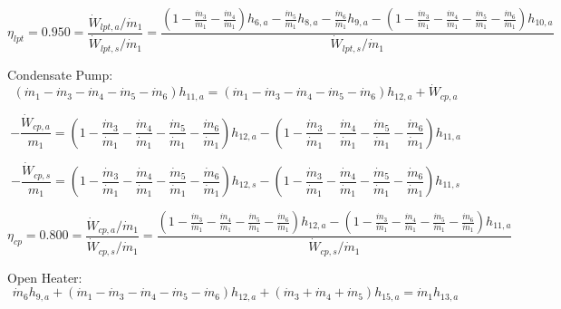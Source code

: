 \documentclass{article}
\begin{document}
\begin{equation}
\eta_{lpt} =    0.950 = \frac{\dot{W}_{lpt,a} / \dot{m}_{1}}{\dot{W}_{lpt,s} / \dot{m}_{1}} = \frac{
(1 - \frac{\dot{m}_{ 3}}{\dot{m}_{ 1}} - \frac{\dot{m}_{ 4}}{\dot{m}_{ 1}})h_{ 6,a} - \frac{\dot{m}_{ 5}}{\dot{m}_{ 1}}h_{ 8,a} - \frac{\dot{m}_{ 6}}{\dot{m}_{ 1}}h_{ 9,a} - (1 - \frac{\dot{m}_{ 3}}{\dot{m}_{ 1}} - \frac{\dot{m}_{ 4}}{\dot{m}_{ 1}} - \frac{\dot{m}_{ 5}}{\dot{m}_{ 1}} - \frac{\dot{m}_{ 6}}{\dot{m}_{ 1}})h_{10,a}}{\dot{W}_{lpt,s} / \dot{m}_{1}}
\end{equation}


Condensate Pump:
\begin{equation}
(\dot{m}_{ 1} - \dot{m}_{ 3} - \dot{m}_{ 4} - \dot{m}_{ 5} - \dot{m}_{ 6})h_{11,a} = (\dot{m}_{ 1} - \dot{m}_{ 3} - \dot{m}_{ 4} - \dot{m}_{ 5} - \dot{m}_{ 6})h_{12,a} + \dot{W}_{cp ,a}
\end{equation}

\begin{equation}
-\frac{\dot{W}_{cp ,a}}{m_1} = (1 - \frac{\dot{m}_{ 3}}{\dot{m}_{ 1}} - \frac{\dot{m}_{ 4}}{\dot{m}_{ 1}} - \frac{\dot{m}_{ 5}}{\dot{m}_{ 1}} - \frac{\dot{m}_{ 6}}{\dot{m}_{ 1}})h_{12,a} - (1 - \frac{\dot{m}_{ 3}}{\dot{m}_{ 1}} - \frac{\dot{m}_{ 4}}{\dot{m}_{ 1}} - \frac{\dot{m}_{ 5}}{\dot{m}_{ 1}} - \frac{\dot{m}_{ 6}}{\dot{m}_{ 1}})h_{11,a}\end{equation}

\begin{equation}
-\frac{\dot{W}_{cp ,s}}{m_1} = (1 - \frac{\dot{m}_{ 3}}{\dot{m}_{ 1}} - \frac{\dot{m}_{ 4}}{\dot{m}_{ 1}} - \frac{\dot{m}_{ 5}}{\dot{m}_{ 1}} - \frac{\dot{m}_{ 6}}{\dot{m}_{ 1}})h_{12,s} - (1 - \frac{\dot{m}_{ 3}}{\dot{m}_{ 1}} - \frac{\dot{m}_{ 4}}{\dot{m}_{ 1}} - \frac{\dot{m}_{ 5}}{\dot{m}_{ 1}} - \frac{\dot{m}_{ 6}}{\dot{m}_{ 1}})h_{11,s}\end{equation}

\begin{equation}
\eta_{cp } =    0.800 = \frac{\dot{W}_{cp ,a} / \dot{m}_{1}}{\dot{W}_{cp ,s} / \dot{m}_{1}} = \frac{
(1 - \frac{\dot{m}_{ 3}}{\dot{m}_{ 1}} - \frac{\dot{m}_{ 4}}{\dot{m}_{ 1}} - \frac{\dot{m}_{ 5}}{\dot{m}_{ 1}} - \frac{\dot{m}_{ 6}}{\dot{m}_{ 1}})h_{12,a} - (1 - \frac{\dot{m}_{ 3}}{\dot{m}_{ 1}} - \frac{\dot{m}_{ 4}}{\dot{m}_{ 1}} - \frac{\dot{m}_{ 5}}{\dot{m}_{ 1}} - \frac{\dot{m}_{ 6}}{\dot{m}_{ 1}})h_{11,a}}{\dot{W}_{cp ,s} / \dot{m}_{1}}
\end{equation}


Open Heater:
\begin{equation}
\dot{m}_{ 6}h_{ 9,a} + (\dot{m}_{ 1} - \dot{m}_{ 3} - \dot{m}_{ 4} - \dot{m}_{ 5} - \dot{m}_{ 6})h_{12,a} + (\dot{m}_{ 3} + \dot{m}_{ 4} + \dot{m}_{ 5})h_{15,a} = \dot{m}_{ 1}h_{13,a}
\end{equation}
\end{document}
